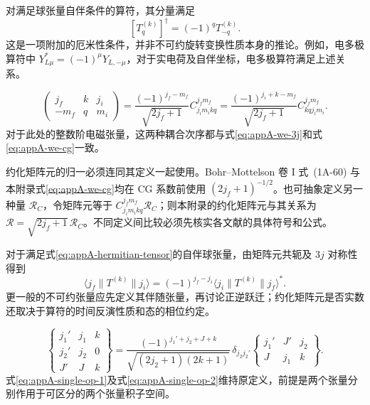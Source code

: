 
对满足球张量自伴条件的算符，其分量满足
\begin{equation}\label{eq:appA-hermitian-tensor}
[T_q^{(k)}]^\dagger=(-1)^qT_{-q}^{(k)}.
\end{equation}
这是一项附加的厄米性条件，并非不可约旋转变换性质本身的推论。例如，电多极算符中 $Y_{L\mu}^*=(-1)^\mu Y_{L,-\mu}$，对于实电荷及自伴坐标，电多极算符满足上述关系。

\begin{equation}\label{eq:appA-3j-cg-relation}
\begin{pmatrix}j_f&k&j_i\\-m_f&q&m_i\end{pmatrix}
=\frac{(-1)^{j_f-m_f}}{\sqrt{2j_f+1}}C_{j_i m_i kq}^{j_fm_f}
=\frac{(-1)^{j_i+k-m_f}}{\sqrt{2j_f+1}}C_{kq j_i m_i}^{j_fm_f}.
\end{equation}
对于此处的整数阶电磁张量，这两种耦合次序都与式\eqref{eq:appA-we-3j}和式\eqref{eq:appA-we-cg}一致。

约化矩阵元的归一必须连同其定义一起使用。Bohr--Mottelson 卷 I 式~(1A-60) 与本附录式\eqref{eq:appA-we-cg}均在 CG 系数前使用 $(2j_f+1)^{-1/2}$。也可抽象定义另一种量 $\mathcal R_C$，令矩阵元等于 $C_{j_i m_i kq}^{j_fm_f}\mathcal R_C$；则本附录的约化矩阵元与其关系为 $\mathcal R=\sqrt{2j_f+1}\,\mathcal R_C$。不同定义间比较必须先核实各文献的具体符号和公式。

对于满足式\eqref{eq:appA-hermitian-tensor}的自伴球张量，由矩阵元共轭及 $3j$ 对称性得到
\begin{equation}\label{eq:appA-rme-exchange}
\langle j_f\|T^{(k)}\|j_i\rangle
=(-1)^{j_f-j_i}\langle j_i\|T^{(k)}\|j_f\rangle^* .
\end{equation}
更一般的不可约张量应先定义其伴随张量，再讨论正逆跃迁；约化矩阵元是否实数还取决于算符的时间反演性质和态的相位约定。

\begin{equation}\label{eq:appA-9j-to-6j}
\begin{Bmatrix}j_1'&j_1&k\\j_2'&j_2&0\\J'&J&k\end{Bmatrix}
=\frac{(-1)^{j_1'+j_2+J+k}}{\sqrt{(2j_2+1)(2k+1)}}\,
\delta_{j_2j_2'}\begin{Bmatrix}j_1'&J'&j_2\\J&j_1&k\end{Bmatrix}.
\end{equation}
式\eqref{eq:appA-single-op-1}及式\eqref{eq:appA-single-op-2}维持原定义，前提是两个张量分别作用于可区分的两个张量积子空间。

